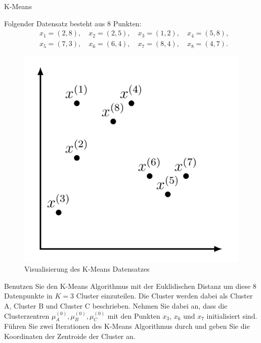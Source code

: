 \begin{task}[credit=6]{K-Means}

Folgender Datensatz besteht aus $8$ Punkten:
\begin{equation}
 \begin{aligned}
&x_1=(2,8), \quad x_2=(2,5),\quad x_3=(1,2), \quad x_4=(5,8),\\
&x_5=(7,3), \quad x_6=(6,4),\quad x_7=(8,4), \quad x_8=(4,7).
 \end{aligned}
\end{equation}

\begin{figure}[h!]
\centering
\includegraphics[width=0.4\linewidth]{media/images/kmeans.png}
\caption{Visualisierung des K-Means Datensatzes}
\end{figure}

\begin{subtask}[points=6,title={K-Means Algorithmus}]
Benutzen Sie den K-Means Algorithmus mit der Euklidischen Distanz um diese $8$ Datenpunkte in $K=3$ Cluster einzuteilen.
Die Cluster werden dabei als Cluster A, Cluster B und Cluster C beschrieben.
Nehmen Sie dabei an, dass die Clusterzentren $\mu_A^{(0)}, \mu_B^{(0)}, \mu_C^{(0)}$  mit den Punkten $x_3$, $x_6$ und $x_7$ initialisiert sind.
Führen Sie zwei Iterationen des K-Means Algorithmus durch und geben Sie die Koordinaten der Zentroide der Cluster an.

\begin{solution}
\end{solution}
\end{subtask}

\end{task}

